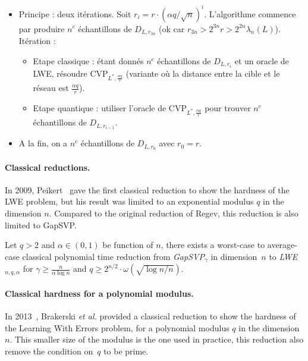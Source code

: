 \begin{itemize}
\begin{itemize}
\item Principe : deux itérations. Soit $r_i = r \cdot (\alpha q / \sqrt{n})^i$. L'algorithme commence par produire $n^c$ échantillons de $D_{L,r_{3n}} $ (ok car $r_{3n} > 2^{3n}r > 2^{2n} \lambda_n(L)$). Itération :
\begin{itemize}
\item Etape classique : étant donnés $n^c$ échantillons de $D_{L,r_i}$ et un oracle de LWE, résoudre CVP$_{L^*,\frac{\alpha q}{r}}$ (variante où la distance entre la cible et le réseau est $\frac{\alpha q}{r}$). 
\item Etape quantique : utiliser l'oracle de CVP$_{L^*,\frac{\alpha q}{r}}$ pour trouver $n^c$ échantillons de $D_{L,r_{i-1}}$.
\end{itemize}
\item A la fin, on a $n^c$ échantillons de $D_{L,r_0}$ avec $r_0=r$.
\end{itemize}
\end{itemize}


\paragraph{Classical reductions.} In 2009, Peikert~\cite{Pei09} gave the first classical reduction to show the hardness of the LWE problem, but his result was limited to an exponential modulus $q$ in the dimension $n$. Compared to the original reduction of Regev, this reduction is also limited to GapSVP.

\begin{theorem}
Let $q >2$ and $\alpha \in (0,1)$ be function of $n$, there exists a worst-case to average-case classical polynomial time reduction from \emph{GapSVP}$_{\gamma}$ in dimension~$n$ to \emph{LWE}$_{n,q,\alpha}$ for $\gamma \geq \frac{n}{\alpha \log n}$ and $q \geq 2^{n/2} \cdot \omega(\sqrt{\log n /n})$. 
\end{theorem}

\paragraph{Classical hardness for a polynomial modulus.} In 2013~\cite{BLPRS13}, Brakerski \emph{et al.} provided a classical reduction to show the hardness of the Learning With Errors problem, for a polynomial modulus $q$ in the dimension $n$. This smaller size of the modulus is the one used in practice, this reduction also remove the condition on~$q$ to be prime.

